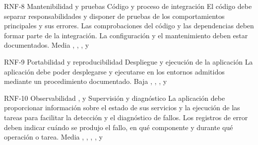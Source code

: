 \requisitoNoFuncional
{RNF-8}
{Mantenibilidad y pruebas}
{}
{Código y proceso de integración}
{El código debe separar responsabilidades y disponer de pruebas de los
comportamientos principales y sus errores. Las comprobaciones del código y las
dependencias deben formar parte de la integración. La configuración y el
mantenimiento deben estar documentados.}
{Media}
{, , ,  y
}

\requisitoNoFuncional
{RNF-9}
{Portabilidad y reproducibilidad}
{}
{Despliegue y ejecución de la aplicación}
{La aplicación debe poder desplegarse y ejecutarse en los entornos admitidos
mediante un procedimiento documentado.}
{Baja}
{, , ,  y
}

\requisitoNoFuncional
{RNF-10}
{Observabilidad}
{,  y }
{Supervisión y diagnóstico}
{La aplicación debe proporcionar información sobre el estado de sus servicios
y la ejecución de las tareas para facilitar la detección y el diagnóstico de
fallos. Los registros de error deben indicar cuándo se produjo el fallo, en qué
componente y durante qué operación o tarea.}
{Media}
{, , ,
,  y }
